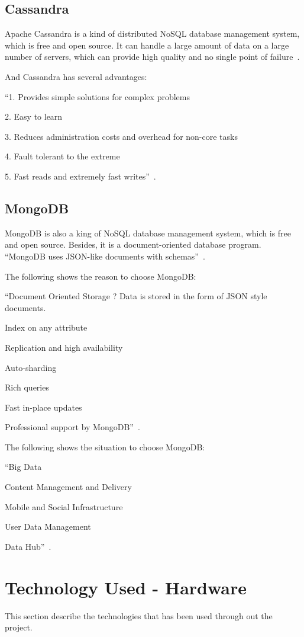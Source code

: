 \subsection{Cassandra}
Apache Cassandra is a kind of distributed NoSQL database management 
system, which is free and open source. It can handle a large amount of 
data on a large number of servers, which can provide high quality and no 
single point of failure~\cite{hid-sp18-508-cassandra}. 

And Cassandra has several advantages:

``1. Provides simple solutions for complex problems

2. Easy to learn

3. Reduces administration costs and overhead for non-core tasks

4. Fault tolerant to the extreme

5. Fast reads and extremely fast writes''~\cite{hid-sp18-508-cassandraAd}. 


\subsection{MongoDB}
MongoDB is also a king of NoSQL database management system, which 
is free and open source. Besides, it is a document-oriented database 
program. ``MongoDB uses JSON-like documents with 
schemas''~\cite{hid-sp18-508-mongodb}.

The following shows the reason to choose MongoDB:

``Document Oriented Storage ? Data is stored in the form of JSON style documents.

Index on any attribute

Replication and high availability

Auto-sharding

Rich queries

Fast in-place updates

Professional support by MongoDB''~\cite{hid-sp18-508-mon}. 


The following shows the situation to choose MongoDB:

``Big Data

Content Management and Delivery

Mobile and Social Infrastructure

User Data Management

Data Hub''~\cite{hid-sp18-508-mon}. 


\section{Technology Used - Hardware}
This section describe the technologies that has been used through out 
the project.

